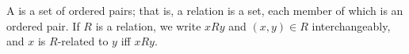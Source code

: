 A  is a set of ordered pairs; that is, a relation is a set, each member of which is an ordered pair.
If $R$ is a relation, we write $xRy$ and $(x,y) \in R$ interchangeably, and $x$ is $R$-related to $y$ iff $xRy$.
